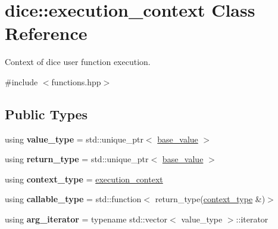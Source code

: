 \hypertarget{classdice_1_1execution__context}{}\section{dice\+:\+:execution\+\_\+context Class Reference}
\label{classdice_1_1execution__context}


Context of dice user function execution.  




{\ttfamily \#include $<$functions.\+hpp$>$}

\subsection*{Public Types}
\begin{DoxyCompactItemize}
\item 
\mbox{\label{classdice_1_1execution__context_a461c5eb10847dc8c55a628f36f5906f3}} 
using {\bfseries value\+\_\+type} = std\+::unique\+\_\+ptr$<$ \mbox{\hyperlink{classdice_1_1base__value}{base\+\_\+value}} $>$
\item 
\mbox{\label{classdice_1_1execution__context_ab2045c32dba1646f204d1f29210bca27}} 
using {\bfseries return\+\_\+type} = std\+::unique\+\_\+ptr$<$ \mbox{\hyperlink{classdice_1_1base__value}{base\+\_\+value}} $>$
\item 
\mbox{\label{classdice_1_1execution__context_af2fbf2afd658b470ebeda96f201922a3}} 
using {\bfseries context\+\_\+type} = \mbox{\hyperlink{classdice_1_1execution__context}{execution\+\_\+context}}
\item 
\mbox{\label{classdice_1_1execution__context_a6694eeb2b6b828de1ab8702ab36b24ad}} 
using {\bfseries callable\+\_\+type} = std\+::function$<$ return\+\_\+type(\mbox{\hyperlink{classdice_1_1execution__context}{context\+\_\+type}} \&)$>$
\item 
\mbox{\label{classdice_1_1execution__context_a5f72a7e31cd0e61be73739469e0676e1}} 
using {\bfseries arg\+\_\+iterator} = typename std\+::vector$<$ value\+\_\+type $>$\+::iterator
\end{DoxyCompactItemize}
